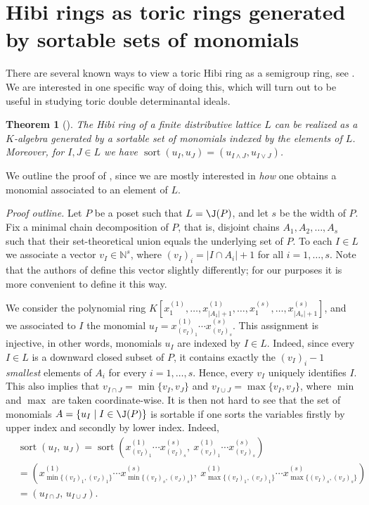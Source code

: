 \documentclass[12pt]{amsart}
\numberwithin{equation}{section}
\newtheorem{theorem}{Theorem}[section]
\theoremstyle{definition}
\def\sort{\operatorname{sort}}
\begin{document}
\section{Hibi rings as toric rings generated by sortable sets of monomials}
There are several known ways to view a toric Hibi ring as a semigroup ring, see \cite{Hi}.
We are interested in one specific way of doing this, which will turn out to be useful in studying toric double determinantal ideals. 

\begin{theorem}[{\cite[Theorem 5.1]{GN}}]
\label{thm: hibisortable}
 The Hibi ring of a finite distributive lattice $L$ can be realized as a $K$-algebra  generated by a sortable set of monomials indexed by the elements of $L$. Moreover, for $I, J \in L$  we have $\sort(u_I,u_J)=(u_{I\wedge J}, u_{I \vee J})$.
\end{theorem}
We outline the proof of {\cite[Theorem 5.1]{GN}}, since we are mostly interested in \emph{how} one obtains a monomial associated to an element of $L$.

\noindent \textit{Proof outline.} 
Let $P$ be a poset such that $L=\J(P)$, and let $s$  be the width of $P$. Fix a minimal chain decomposition of $P$, that is, disjoint chains $A_1, A_2,\ldots, A_s$ such that their set-theoretical union equals the underlying set of $P$. To each $I\in L$ we associate a vector $v_I\in  \mathbb{N}^s$, where $(v_I)_i=|I\cap A_i|+1$ for all $i=1,\ldots,s$. Note that the authors of {\cite[Theorem 5.1]{GN}} define this vector slightly differently; for our purposes it is more convenient to define it this way.

We consider the polynomial ring $K[x^{(1)}_{1},\ldots, x^{(1)}_{|A_1|+1}, \dots, x^{(s)}_{1},\ldots, x^{(s)}_{|A_s|+1}]$, and we associated to  $I$ the monomial $u_I=x^{(1)}_{(v_I)_1}\cdots x^{(s)}_{(v_I)_s}$. This assignment is injective, in other words, monomials $u_I$ are indexed by $I\in L$. Indeed, since every $I\in L$ is a downward closed subset of $P$, it contains exactly the $(v_I)_i-1$ \emph{smallest} elements of $A_i$ for every $i=1,\ldots, s$. Hence, every $v_I$ uniquely identifies $I$. This also implies that $v_{I\cap J}=\min\{v_I,v_J\}$ and $v_{I\cup J}=\max\{v_I,v_J\}$, where $\min$ and $\max$ are taken coordinate-wise. It is then not hard to see that the set of monomials $A=\{u_I\mid I\in \J(P)\}$ is sortable if one sorts the variables firstly by upper index and secondly by lower index. Indeed,
\begin{align*}
&\sort(u_I,\, u_J)= \sort(x^{(1)}_{(v_I)_1}\cdots x^{(s)}_{(v_I)_s},\ x^{(1)}_{(v_J)_1}\cdots x^{(s)}_{(v_J)_s})\\
&=(x^{(1)}_{\min\{(v_I)_1, (v_J)_1\}}\cdots x^{(s)}_{\min\{(v_I)_s, (v_J)_s\}},\ x^{(1)}_{\max\{(v_I)_1, (v_J)_1\}}\cdots x^{(s)}_{\max\{(v_I)_s, (v_J)_s\}})\\ &= (u_{I\cap J},\, u_{I\cup J}).
\end{align*}
\end{document}
